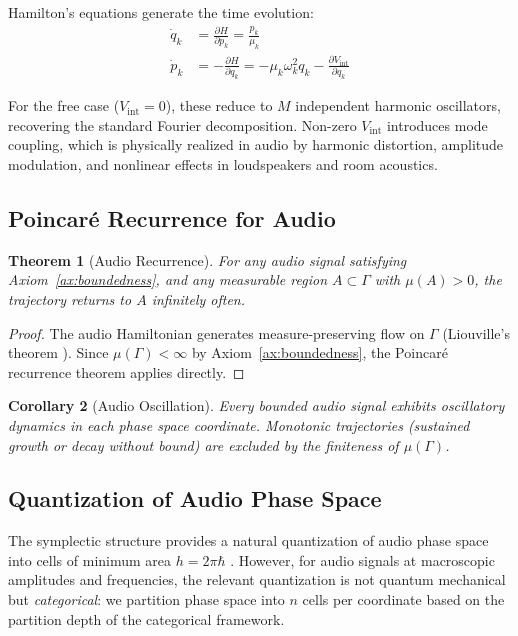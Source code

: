 \documentclass[twocolumn,10pt]{article}
\newtheorem{theorem}{Theorem}[section]
\newtheorem{corollary}[theorem]{Corollary}
\theoremstyle{remark}
\begin{document}
Hamilton's equations generate the time evolution:
\begin{align}
    \dot{q}_k &= \frac{\partial H}{\partial p_k} = \frac{p_k}{\mu_k} \label{eq:hamilton_q} \\
    \dot{p}_k &= -\frac{\partial H}{\partial q_k} = -\mu_k \omega_k^2 q_k - \frac{\partial V_{\mathrm{int}}}{\partial q_k} \label{eq:hamilton_p}
\end{align}

For the free case ($V_{\mathrm{int}} = 0$), these reduce to $M$ independent harmonic oscillators, recovering the standard Fourier decomposition. Non-zero $V_{\mathrm{int}}$ introduces mode coupling, which is physically realized in audio by harmonic distortion, amplitude modulation, and nonlinear effects in loudspeakers and room acoustics.

\subsection{Poincar\'{e} Recurrence for Audio}

\begin{theorem}[Audio Recurrence]
\label{thm:audio_recurrence}
For any audio signal satisfying Axiom~\ref{ax:boundedness}, and any measurable region $A \subset \Gamma$ with $\mu(A) > 0$, the trajectory returns to $A$ infinitely often.
\end{theorem}

\begin{proof}
The audio Hamiltonian generates measure-preserving flow on $\Gamma$ (Liouville's theorem \cite{arnold1989}). Since $\mu(\Gamma) < \infty$ by Axiom~\ref{ax:boundedness}, the Poincar\'{e} recurrence theorem \cite{poincare1890} applies directly.
\end{proof}

\begin{corollary}[Audio Oscillation]
\label{cor:audio_oscillation}
Every bounded audio signal exhibits oscillatory dynamics in each phase space coordinate. Monotonic trajectories (sustained growth or decay without bound) are excluded by the finiteness of $\mu(\Gamma)$.
\end{corollary}

\subsection{Quantization of Audio Phase Space}

The symplectic structure provides a natural quantization of audio phase space into cells of minimum area $h = 2\pi\hbar$ \cite{arnold1989}. However, for audio signals at macroscopic amplitudes and frequencies, the relevant quantization is not quantum mechanical but \textit{categorical}: we partition phase space into $n$ cells per coordinate based on the partition depth of the categorical framework.
\end{document}

